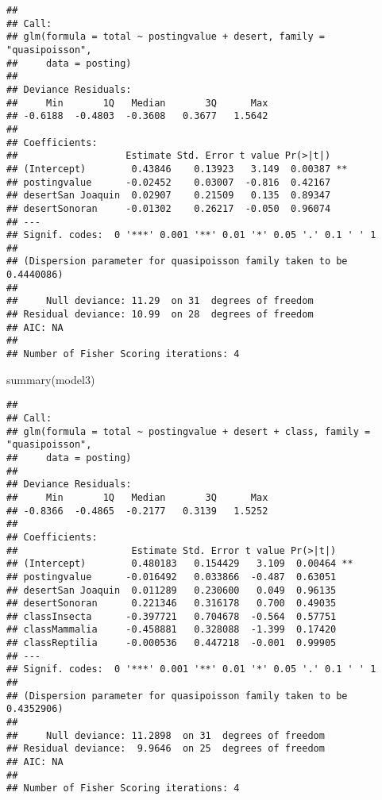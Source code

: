 \documentclass[
]{article}
\newenvironment{Shaded}{\begin{snugshade}}{\end{snugshade}}
\newcommand{\FunctionTok}[1]{\textcolor[rgb]{0.00,0.00,0.00}{#1}}
\newcommand{\NormalTok}[1]{#1}
\begin{document}
\begin{verbatim}
## 
## Call:
## glm(formula = total ~ postingvalue + desert, family = "quasipoisson", 
##     data = posting)
## 
## Deviance Residuals: 
##     Min       1Q   Median       3Q      Max  
## -0.6188  -0.4803  -0.3608   0.3677   1.5642  
## 
## Coefficients:
##                   Estimate Std. Error t value Pr(>|t|)   
## (Intercept)        0.43846    0.13923   3.149  0.00387 **
## postingvalue      -0.02452    0.03007  -0.816  0.42167   
## desertSan Joaquin  0.02907    0.21509   0.135  0.89347   
## desertSonoran     -0.01302    0.26217  -0.050  0.96074   
## ---
## Signif. codes:  0 '***' 0.001 '**' 0.01 '*' 0.05 '.' 0.1 ' ' 1
## 
## (Dispersion parameter for quasipoisson family taken to be 0.4440086)
## 
##     Null deviance: 11.29  on 31  degrees of freedom
## Residual deviance: 10.99  on 28  degrees of freedom
## AIC: NA
## 
## Number of Fisher Scoring iterations: 4
\end{verbatim}

\begin{Shaded}
\begin{Highlighting}[]
\FunctionTok{summary}\NormalTok{(model3)}
\end{Highlighting}
\end{Shaded}

\begin{verbatim}
## 
## Call:
## glm(formula = total ~ postingvalue + desert + class, family = "quasipoisson", 
##     data = posting)
## 
## Deviance Residuals: 
##     Min       1Q   Median       3Q      Max  
## -0.8366  -0.4865  -0.2177   0.3139   1.5252  
## 
## Coefficients:
##                    Estimate Std. Error t value Pr(>|t|)   
## (Intercept)        0.480183   0.154429   3.109  0.00464 **
## postingvalue      -0.016492   0.033866  -0.487  0.63051   
## desertSan Joaquin  0.011289   0.230600   0.049  0.96135   
## desertSonoran      0.221346   0.316178   0.700  0.49035   
## classInsecta      -0.397721   0.704678  -0.564  0.57751   
## classMammalia     -0.458881   0.328088  -1.399  0.17420   
## classReptilia     -0.000536   0.447218  -0.001  0.99905   
## ---
## Signif. codes:  0 '***' 0.001 '**' 0.01 '*' 0.05 '.' 0.1 ' ' 1
## 
## (Dispersion parameter for quasipoisson family taken to be 0.4352906)
## 
##     Null deviance: 11.2898  on 31  degrees of freedom
## Residual deviance:  9.9646  on 25  degrees of freedom
## AIC: NA
## 
## Number of Fisher Scoring iterations: 4
\end{verbatim}
\end{document}
